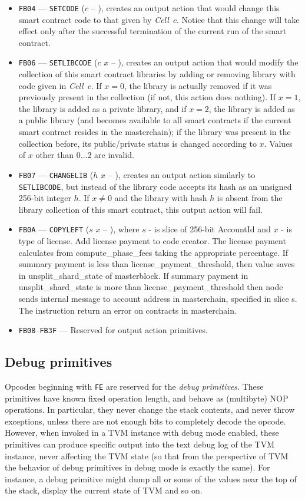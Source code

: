 \documentclass[12pt,oneside]{article}
\def\mysubsection#1{\subsection{#1}\fancyhead[C]{\small{\textsc{\textrm{\thesubsection.} #1}}}}
\begin{document}
\begin{itemize}
\item {\tt FB04} --- {\tt SETCODE} ($c$ -- ), creates an output action that would change this smart contract code to that given by {\em Cell\/}~$c$. Notice that this change will take effect only after the successful termination of the current run of the smart contract.
\item {\tt FB06} --- {\tt SETLIBCODE} ($c$ $x$ -- ), creates an output action that would modify the collection of this smart contract libraries by adding or removing library with code given in {\em Cell\/}~$c$. If $x=0$, the library is actually removed if it was previously present in the collection (if not, this action does nothing). If $x=1$, the library is added as a private library, and if $x=2$, the library is added as a public library (and becomes available to all smart contracts if the current smart contract resides in the masterchain); if the library was present in the collection before, its public/private status is changed according to $x$. Values of $x$ other than $0\ldots 2$ are invalid.
\item {\tt FB07} --- {\tt CHANGELIB} ($h$ $x$ -- ), creates an output action similarly to {\tt SETLIBCODE}, but instead of the library code accepts its hash as an unsigned 256-bit integer $h$. If $x\neq0$ and the library with hash $h$ is absent from the library collection of this smart contract, this output action will fail.
\item {\tt FB0A} --- {\tt COPYLEFT} ($s$ $x$ -- ), where $s$ - is slice of 256-bit AccountId and $x$ - is type of license. Add license payment to code creator. The license payment calculates from compute\_phase\_fees taking the appropriate percentage. If summary payment is less than license\_payment\_threshold, then value saves in unsplit\_shard\_state of masterblock. If summary payment in unsplit\_shard\_state is more than license\_payment\_threshold then node sends internal message to account address in masterchain, specified in slice s. The instruction return an error on contracts in masterchain.
\item {\tt FB08}--{\tt FB3F} --- Reserved for output action primitives.
\end{itemize}

\mysubsection{Debug primitives}\label{p:prim.debug}
Opcodes beginning with {\tt FE} are reserved for the {\em debug primitives}. These primitives have known fixed operation length, and behave as (multibyte) NOP operations. In particular, they never change the stack contents, and never throw exceptions, unless there are not enough bits to completely decode the opcode. However, when invoked in a TVM instance with debug mode enabled, these primitives can produce specific output into the text debug log of the TVM instance, never affecting the TVM state (so that from the perspective of TVM the behavior of debug primitives in debug mode is exactly the same). For instance, a debug primitive might dump all or some of the values near the top of the stack, display the current state of TVM and so on.
\end{document}
